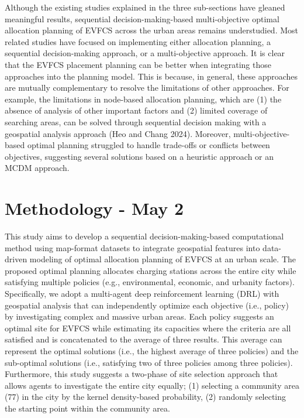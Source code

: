 \documentclass[preprint,12pt]{elsarticle}
\begin{document}
\vspace{0.5cm}

Although the existing studies explained in the three sub-sections have gleaned meaningful results, sequential decision-making-based multi-objective optimal allocation planning of EVFCS across the urban areas remains understudied. Most related studies have focused on implementing either allocation planning, a sequential decision-making approach, or a multi-objective approach. It is clear that the EVFCS placement planning can be better when integrating those approaches into the planning model. This is because, in general, these approaches are mutually complementary to resolve the limitations of other approaches. For example, the limitations in node-based allocation planning, which are (1) the absence of analysis of other important factors and (2) limited coverage of searching areas, can be solved through sequential decision making with a geospatial analysis approach (Heo and Chang 2024). Moreover, multi-objective-based optimal planning struggled to handle trade-offs or conflicts between objectives, suggesting several solutions based on a heuristic approach or an MCDM approach. 

\vspace{5pt}

\section{Methodology - May 2}
This study aims to develop a sequential decision-making-based computational method using map-format datasets to integrate geospatial features into data-driven modeling of optimal allocation planning of EVFCS at an urban scale. The proposed optimal planning allocates charging stations across the entire city while satisfying multiple policies (e.g., environmental, economic, and urbanity factors). Specifically, we adopt a multi-agent deep reinforcement learning (DRL) with geospatial analysis that can independently optimize each objective (i.e., policy) by investigating complex and massive urban areas. Each policy suggests an optimal site for EVFCS while estimating its capacities where the criteria are all satisfied and is concatenated to the average of three results. This average can represent the optimal solutions (i.e., the highest average of three policies) and the sub-optimal solutions (i.e., satisfying two of three policies among three policies). Furthermore, this study suggests a two-phase of site selection approach that allows agents to investigate the entire city equally; (1) selecting a community area (77) in the city by the kernel density-based probability, (2) randomly selecting the starting point within the community area. 
\end{document}
